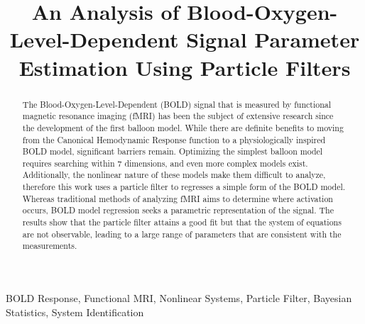 \documentclass{article}
\title{An Analysis of Blood-Oxygen-Level-Dependent Signal Parameter Estimation Using Particle Filters}
\begin{document}
%
\maketitle
%
\begin{abstract}
The Blood-Oxygen-Level-Dependent (BOLD) signal that is measured by functional 
magnetic resonance imaging (fMRI)
has been the subject of extensive research since the development 
of the first balloon model. While there are definite benefits to 
moving from the Canonical Hemodynamic Response function to a physiologically inspired
BOLD model, significant barriers remain. Optimizing the simplest
balloon model requires searching within 7 dimensions, and even more complex
models exist. Additionally, the nonlinear nature of these models
make them difficult to analyze, therefore this work 
uses a particle filter to regresses a simple form of the BOLD 
model. Whereas traditional methods of analyzing fMRI aims
to determine where activation occurs, BOLD model regression seeks a parametric representation
of the signal. The results show that the particle filter 
attains a good fit but that the system of equations are not observable,
leading to a large range of parameters that are consistent with the measurements. 
\end{abstract}
%
\begin{keywords}
BOLD Response, Functional MRI, Nonlinear Systems, Particle Filter, Bayesian Statistics, System Identification
\end{keywords}
%

\begin{acronym}[CMRO2]
\end{acronym}
\end{document}
